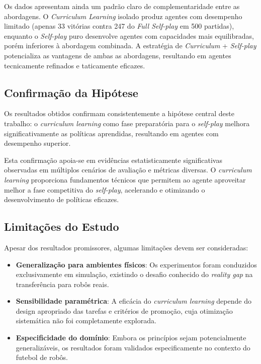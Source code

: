 Os dados apresentam ainda um padrão claro de complementaridade entre as abordagens. O \textit{Curriculum Learning} isolado produz agentes com desempenho limitado (apenas 33 vitórias contra 247 do \textit{Full Self-play} em 500 partidas), enquanto o \textit{Self-play} puro desenvolve agentes com capacidades mais equilibradas, porém inferiores à abordagem combinada. A estratégia de \textit{Curriculum} + \textit{Self-play} potencializa as vantagens de ambas as abordagens, resultando em agentes tecnicamente refinados e taticamente eficazes.

\subsection{Confirmação da Hipótese}

Os resultados obtidos confirmam consistentemente a hipótese central deste trabalho: o \textit{curriculum learning} como fase preparatória para o \textit{self-play} melhora significativamente as políticas aprendidas, resultando em agentes com desempenho superior.

Esta confirmação apoia-se em evidências estatisticamente significativas observadas em múltiplos cenários de avaliação e métricas diversas. O \textit{curriculum learning} proporciona fundamentos técnicos que permitem ao agente aproveitar melhor a fase competitiva do \textit{self-play}, acelerando e otimizando o desenvolvimento de políticas eficazes.

\subsection{Limitações do Estudo}

Apesar dos resultados promissores, algumas limitações devem ser consideradas:

\begin{itemize}
    \item \textbf{Generalização para ambientes físicos}: Os experimentos foram conduzidos exclusivamente em simulação, existindo o desafio conhecido do \textit{reality gap} na transferência para robôs reais.
    
    \item \textbf{Sensibilidade paramétrica}: A eficácia do \textit{curriculum learning} depende do design apropriado das tarefas e critérios de promoção, cuja otimização sistemática não foi completamente explorada.
    
    \item \textbf{Especificidade do domínio}: Embora os princípios sejam potencialmente generalizáveis, os resultados foram validados especificamente no contexto do futebol de robôs.
\end{itemize}

